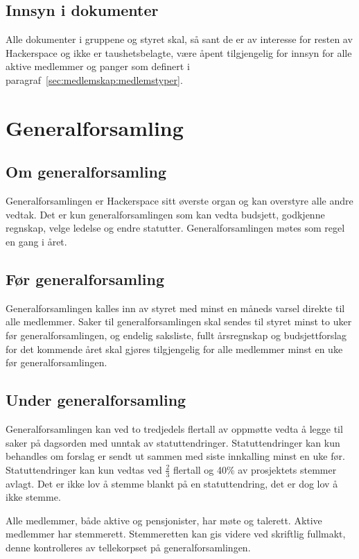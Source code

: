\subsection{Innsyn i dokumenter}\label{sec:struktur:innsyn}
Alle dokumenter i gruppene og styret skal, så sant de er av interesse for resten av Hackerspace og ikke er taushetsbelagte, være åpent tilgjengelig for innsyn for alle aktive medlemmer og panger som definert i paragraf~\ref{sec:medlemskap:medlemstyper}.


\section{Generalforsamling}\label{sec:generalforsamling}
\subsection{Om generalforsamling}\label{sec:generalforsamling:om}
Generalforsamlingen er Hackerspace sitt øverste organ og kan overstyre alle andre vedtak.
Det er kun generalforsamlingen som kan vedta budsjett, godkjenne regnskap, velge ledelse og endre statutter.
Generalforsamlingen møtes som regel en gang i året.

\subsection{Før generalforsamling}\label{sec:generalforsamling:før}
Generalforsamlingen kalles inn av styret med minst en måneds varsel direkte til alle medlemmer.
Saker til generalforsamlingen skal sendes til styret minst to uker før generalforsamlingen, og endelig saksliste, fullt årsregnskap og budsjettforslag for det kommende året skal gjøres tilgjengelig for alle medlemmer minst en uke før generalforsamlingen.

\subsection{Under generalforsamling}\label{sec:generalforsamling:under}
Generalforsamlingen kan ved to tredjedels flertall av oppmøtte vedta å legge til saker på dagsorden med unntak av statuttendringer.
Statuttendringer kan kun behandles om forslag er sendt ut sammen med siste innkalling minst en uke før.
Statuttendringer kan kun vedtas ved $\frac{2}{3}$ flertall og 40\% av prosjektets stemmer avlagt.
Det er ikke lov å stemme blankt på en statuttendring, det er dog lov å ikke stemme.

Alle medlemmer, både aktive og pensjonister, har møte og talerett.
Aktive medlemmer har stemmerett.
Stemmeretten kan gis videre ved skriftlig fullmakt, denne kontrolleres av tellekorpset på generalforsamlingen.

